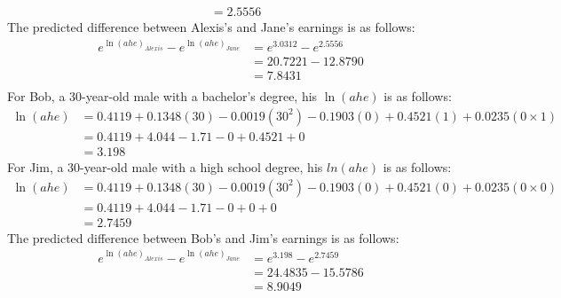 \documentclass{uofa-eng-assignment}
\begin{document}
\begin{enumerate}
\begin{align*}
                         & = \boldsymbol{2.5556}
          \end{align*}
          The predicted difference between Alexis's and Jane's earnings is as follows:
          \begin{align*}
              e^{\ln{{(ahe)}_{Alexis}}} - e^{\ln{{(ahe)}_{Jane}}} & = e^{3.0312} - e^{2.5556} \\
                                                                  & = 20.7221 - 12.8790       \\
                                                                  & = \boldsymbol{7.8431}     \\
          \end{align*}
          For Bob, a 30-year-old male with a bachelor's degree, his $\ln{(ahe)}$ is as follows:
          \begin{align*}
              \ln{(ahe)} & = 0.4119 + 0.1348 (30) - 0.0019 (30^2) - 0.1903 (0) + 0.4521 (1) + 0.0235 (0 \times 1) \\
                         & = 0.4119 + 4.044 - 1.71 - 0 + 0.4521 + 0                                               \\
                         & = \boldsymbol{3.198}
          \end{align*}
          For Jim, a 30-year-old male with a high school degree, his $ln(ahe)$ is as follows:
          \begin{align*}
              \ln{(ahe)} & = 0.4119 + 0.1348 (30) - 0.0019 (30^2) - 0.1903 (0) + 0.4521 (0) + 0.0235 (0 \times 0) \\
                         & = 0.4119 + 4.044 - 1.71 - 0 + 0 + 0                                                    \\
                         & = \boldsymbol{2.7459}
          \end{align*}    The predicted difference between Bob's and Jim's earnings is as follows:
          \begin{align*}
              e^{\ln{{(ahe)}_{Alexis}}} - e^{\ln{{(ahe)}_{Jane}}} & = e^{3.198} - e^{2.7459} \\
                                                                  & = 24.4835 - 15.5786      \\
                                                                  & = \boldsymbol{8.9049}
          \end{align*}

\end{enumerate}
\end{document}
